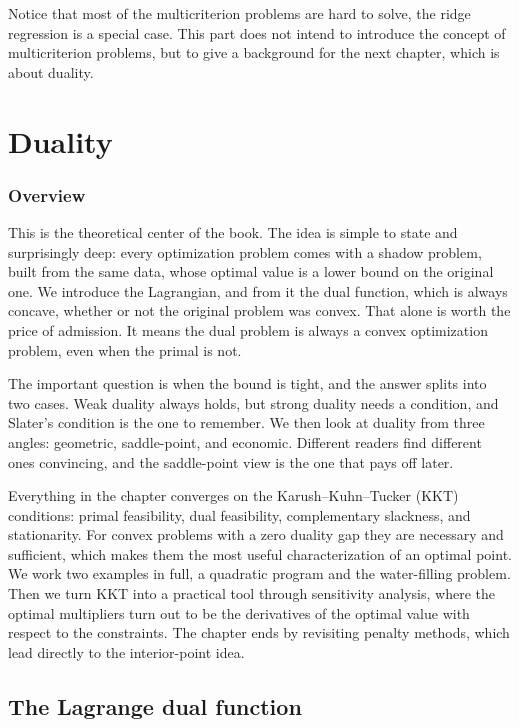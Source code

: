 \documentclass[lang=en,color=blue,mode=fancy,titlestyle=hang]{elegantbook}
\begin{document}
Notice that most of the multicriterion problems are hard to solve, the ridge regression is
a special case. This part does not intend to introduce the concept of multicriterion problems,
but to give a background for the next chapter, which is about duality.

\chapter{Duality}

\subsection*{Overview}

This is the theoretical center of the book. The idea is simple to state and surprisingly
deep: every optimization problem comes with a shadow problem, built from the same data,
whose optimal value is a lower bound on the original one. We introduce the Lagrangian, and
from it the dual function, which is always concave, whether or not the original problem was
convex. That alone is worth the price of admission. It means the dual problem is always a
convex optimization problem, even when the primal is not.

The important question is when the bound is tight, and the answer splits into two cases.
Weak duality always holds, but strong duality needs a condition, and Slater's condition is
the one to remember. We then look at duality from three angles: geometric, saddle-point,
and economic. Different readers find different ones convincing, and the saddle-point view
is the one that pays off later.

Everything in the chapter converges on the Karush–Kuhn–Tucker (KKT) conditions: primal
feasibility, dual feasibility, complementary slackness, and stationarity. For convex
problems with a zero duality gap they are necessary and sufficient, which makes them the
most useful characterization of an optimal point. We work two examples in full, a quadratic
program and the water-filling problem. Then we turn KKT into a practical tool through
sensitivity analysis, where the optimal multipliers turn out to be the derivatives of the
optimal value with respect to the constraints. The chapter ends by revisiting penalty
methods, which lead directly to the interior-point idea.


\section{The Lagrange dual function}
\end{document}
